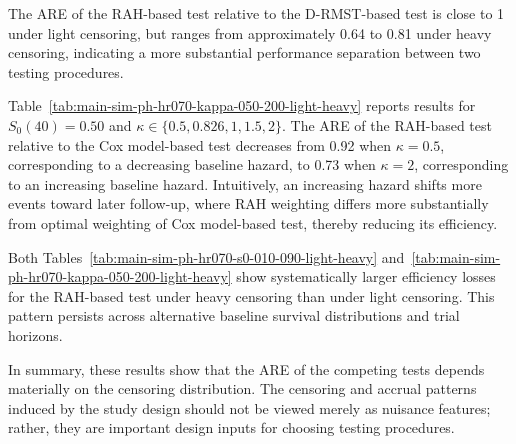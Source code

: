 \documentclass[12pt]{article}
\begin{document}
The ARE of the RAH-based test relative to the D-RMST-based test is close to 1 under light censoring, but ranges from approximately 0.64 to 0.81 under heavy censoring, indicating a more substantial performance separation between two testing procedures.



Table~\ref{tab:main-sim-ph-hr070-kappa-050-200-light-heavy} reports results for \(S_0(40)=0.50\) and \(\kappa\in\{0.5,0.826,1,1.5,2\}\). The ARE of the RAH-based test relative to the Cox model-based test decreases from 0.92 when \(\kappa=0.5\), corresponding to a decreasing baseline hazard, to 0.73 when \(\kappa=2\), corresponding to an increasing baseline hazard. Intuitively, an increasing hazard shifts more events toward later follow-up, where RAH weighting differs more substantially from optimal weighting of Cox model-based test, thereby reducing its efficiency.

Both Tables~\ref{tab:main-sim-ph-hr070-s0-010-090-light-heavy} and~\ref{tab:main-sim-ph-hr070-kappa-050-200-light-heavy} show systematically larger efficiency losses for the RAH-based test under heavy censoring than under light censoring. This pattern persists across alternative baseline survival distributions and trial horizons.

In summary, these results show that the ARE of the competing tests depends materially on the censoring distribution. The censoring and accrual patterns induced by the study design should not be viewed merely as nuisance features; rather, they are important design inputs for choosing testing procedures.
\end{document}
